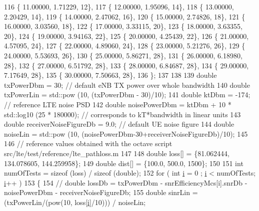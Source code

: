 \begin{DoxyCode}
116     \{ 11.00000,  1.71229,        12\},
117     \{ 12.00000,  1.95096,        14\},
118     \{ 13.00000,  2.20429,        14\},
119     \{ 14.00000,  2.47062,        16\},
120     \{ 15.00000,  2.74826,        18\},
121     \{ 16.00000,  3.03560,        18\},
122     \{ 17.00000,  3.33115,        20\},
123     \{ 18.00000,  3.63355,        20\},
124     \{ 19.00000,  3.94163,        22\},
125     \{ 20.00000,  4.25439,        22\},
126     \{ 21.00000,  4.57095,        24\},
127     \{ 22.00000,  4.89060,        24\},
128     \{ 23.00000,  5.21276,        26\},
129     \{ 24.00000,  5.53693,        26\},
130     \{ 25.00000,  5.86271,        28\},
131     \{ 26.00000,  6.18980,        28\},
132     \{ 27.00000,  6.51792,        28\},
133     \{ 28.00000,  6.84687,        28\},
134     \{ 29.00000,  7.17649,        28\},
135     \{ 30.00000,  7.50663,        28\},
136   \};
137 
138 
139   \textcolor{keywordtype}{double} txPowerDbm = 30; \textcolor{comment}{// default eNB TX power over whole bandwidth}
140   \textcolor{keywordtype}{double} txPowerLin = std::pow (10, (txPowerDbm - 30)/10);
141   \textcolor{keywordtype}{double} ktDbm = -174;    \textcolor{comment}{// reference LTE noise PSD}
142   \textcolor{keywordtype}{double} noisePowerDbm = ktDbm + 10 * std::log10 (25 * 180000); \textcolor{comment}{// corresponds to kT*bandwidth in linear
       units}
143   \textcolor{keywordtype}{double} receiverNoiseFigureDb = 9.0; \textcolor{comment}{// default UE noise figure}
144   \textcolor{keywordtype}{double} noiseLin = std::pow (10, (noisePowerDbm-30+receiverNoiseFigureDb)/10);
145 
146   \textcolor{comment}{// reference values obtained with the octave script src/lte/test/reference/lte\_pathloss.m}
147 
148   \textcolor{keywordtype}{double} loss[] = \{81.062444, 134.078605, 144.259958\};
149   \textcolor{keywordtype}{double} dist[] = \{100.0, 500.0, 1500\};
150 
151   \textcolor{keywordtype}{int} numOfTests = \textcolor{keyword}{sizeof} (loss) / \textcolor{keyword}{sizeof} (\textcolor{keywordtype}{double});
152   \textcolor{keywordflow}{for} ( \textcolor{keywordtype}{int} \hyperlink{bernuolliDistribution_8m_a6f6ccfcf58b31cb6412107d9d5281426}{i} = 0 ; \hyperlink{bernuolliDistribution_8m_a6f6ccfcf58b31cb6412107d9d5281426}{i} < numOfTests; \hyperlink{bernuolliDistribution_8m_a6f6ccfcf58b31cb6412107d9d5281426}{i}++ )
153   \{
154     \textcolor{comment}{//     double lossDb = txPowerDbm - snrEfficiencyMcs[i].snrDb - noisePowerDbm - receiverNoiseFigureDb;}
155     \textcolor{keywordtype}{double} sinrLin = (txPowerLin/(pow(10, loss[\hyperlink{bernuolliDistribution_8m_a6f6ccfcf58b31cb6412107d9d5281426}{i}]/10))) / noiseLin;

\end{DoxyCode}
